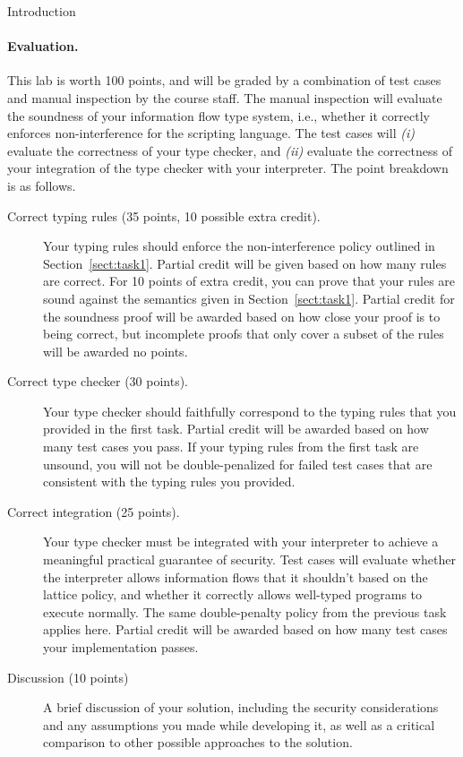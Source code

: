 \documentclass[11pt]{article}
\begin{document}
{\begin{problem}{Introduction}
  \paragraph{Evaluation.}
    This lab is worth 100 points, and will be graded by a combination of test cases and manual inspection by the course staff. 
    The manual inspection will evaluate the soundness of your information flow type system, i.e., whether it correctly enforces 
    non-interference for the scripting language. The test cases will \emph{(i)} evaluate the correctness of your type checker, 
    and \emph{(ii)} evaluate the correctness of your integration of the type checker with your interpreter.
    The point breakdown is as follows.
    \begin{description}
      \item[Correct typing rules (35 points, 10 possible extra credit).] Your typing rules should enforce the non-interference 
      policy outlined in Section~\ref{sect:task1}. Partial credit will be given based on how many rules are correct. 
      For 10 points of extra credit, you can prove that your rules are sound against the semantics given in Section~\ref{sect:task1}. 
      Partial credit for the soundness proof will be awarded based on how close your proof is to being correct, but incomplete proofs 
      that only cover a subset of the rules will be awarded no points.
      \item[Correct type checker (30 points).] Your type checker should faithfully correspond to the typing rules that you provided in 
      the first task. Partial credit will be awarded based on how many test cases you pass. If your typing rules from the first task 
      are unsound, you will not be double-penalized for failed test cases that are consistent with the typing rules you provided.
      \item[Correct integration (25 points).] Your type checker must be integrated with your interpreter to achieve a meaningful 
      practical guarantee of security. Test cases will evaluate whether the interpreter allows information flows that it shouldn't
       based on the lattice policy, and whether it correctly allows well-typed programs to execute normally. The same double-penalty
        policy from the previous task applies here. Partial credit will be awarded based on how many test cases your implementation passes.
      \item[Discussion (10 points)] A brief discussion of your solution, including the security considerations and any assumptions you made 
      while developing it, as well as a critical comparison to other possible approaches to the solution.
    \end{description}
\end{problem}

}
\end{document}
